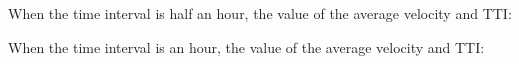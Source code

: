 \documentclass[fontset=none]{ctexart}
\theoremstyle{definition}
\theoremstyle{remark}
\begin{document}
\clearpage
When the time interval is half an hour, the value of the average velocity and TTI:
\begin{figure}[h]
  \centering
  \quad
\end{figure}

When the time interval is an hour, the value of the average velocity and TTI:
\begin{figure}[h]
  \centering
  \quad
\end{figure}
\end{document}
